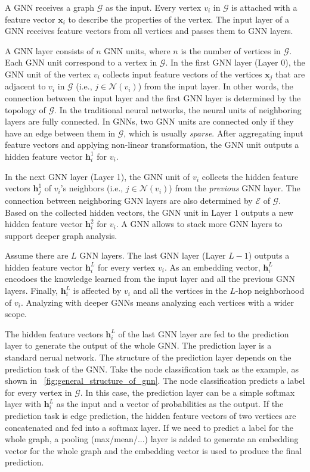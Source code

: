 A GNN receives a graph $\mathcal{G}$ as the input.
Every vertex $v_i$ in $\mathcal{G}$ is attached with a feature vector $\boldsymbol{x}_i$ to describe the properties of the vertex.
The input layer of a GNN receives feature vectors from all vertices and passes them to GNN layers.

A GNN layer consists of $n$ GNN units, where $n$ is the number of vertices in $\mathcal{G}$.
Each GNN unit correspond to a vertex in $\mathcal{G}$.
In the first GNN layer (Layer 0), the GNN unit of the vertex $v_i$ collects input feature vectors of the vertices $\boldsymbol{x}_j$ that are adjacent to $v_i$ in $\mathcal{G}$ (i.e., $j \in \mathcal{N}(v_i)$) from the input layer.
In other words, the connection between the input layer and the first GNN layer is determined by the topology of $\mathcal{G}$.
In the traditional neural networks, the neural units of neighboring layers are fully connected.
In GNNs, two GNN units are connected only if they have an edge between them in $\mathcal{G}$, which is usually \emph{sparse}.
After aggregating input feature vectors and applying non-linear transformation, the GNN unit outputs a hidden feature vector $\boldsymbol{h}^1_i$ for $v_i$.

In the next GNN layer (Layer 1), the GNN unit of $v_i$ collects the hidden feature vectors $\boldsymbol{h}^1_j$ of $v_i$'s neighbors (i.e., $j \in \mathcal{N}(v_i)$) from the \emph{previous} GNN layer.
The connection between neighboring GNN layers are also determined by $\mathcal{E}$ of $\mathcal{G}$.
Based on the collected hidden vectors, the GNN unit in Layer 1 outputs a new hidden feature vector $\boldsymbol{h}^2_i$ for $v_i$.
A GNN allows to stack more GNN layers to support deeper graph analysis.

Assume there are $L$ GNN layers.
The last GNN layer (Layer $L-1$) outputs a hidden feature vector $\boldsymbol{h}^{L}_i$ for every vertex $v_i$.
As an embedding vector, $\boldsymbol{h}^L_i$ encodoes the knowledge learned from the input layer and all the previous GNN layers.
Finally, $\boldsymbol{h}^L_i$ is affected by $v_i$ and all the vertices in the $L$-hop neighborhood of $v_i$.
Analyzing with deeper GNNs means analyzing each vertices with a wider scope.

The hidden feature vectors $\boldsymbol{h}^L_i$ of the last GNN layer are fed to the prediction layer to generate the output of the whole GNN.
The prediction layer is a standard nerual network.
The structure of the prediction layer depends on the prediction task of the GNN.
Take the node classification task as the example, as shown in \figurename~\ref{fig:general_structure_of_gnn}.
The node classification predicts a label for every vertex in $\mathcal{G}$.
In this case, the prediction layer can be a simple softmax layer with $\boldsymbol{h}^L_i$ as the input and a vector of probabilities as the output.
If the prediction task is edge prediction, the hidden feature vectors of two vertices are concatenated and fed into a softmax layer.
If we need to predict a label for the whole graph, a pooling (max/mean/...) layer is added to generate an embedding vector for the whole graph and the embedding vector is used to produce the final prediction.

